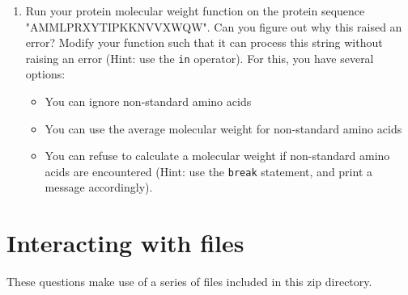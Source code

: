 \documentclass{article}[12pt]
\newcommand{\code}[1]{\texttt{#1}}  %
\begin{document}
\begin{enumerate}[itemsep=5ex]
	\item Run your protein molecular weight function on the protein sequence "AMMLPRXYTIPKKNVVXWQW". Can you figure out why this raised an error? Modify your function such that it can process this string without raising an error (Hint: use the \code{in} operator). For this, you have several options:
	\begin{itemize}
		\item You can ignore non-standard amino acids
		\item You can use the average molecular weight for non-standard amino acids
		\item You can refuse to calculate a molecular weight if non-standard amino acids are encountered (Hint: use the \code{break} statement, and print a message accordingly).
	\end{itemize}
	
		
\end{enumerate}


\vspace{2.25cm}


\section{Interacting with files}

These questions make use of a series of files included in this zip directory. 
\end{document}
